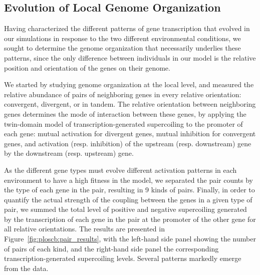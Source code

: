 \subsection{Evolution of Local Genome Organization}

Having characterized the different patterns of gene transcription that evolved in our simulations in response to the two different environmental conditions, we sought to determine the genome organization that necessarily underlies these patterns, since the only difference between individuals in our model is the relative position and orientation of the genes on their genome.

We started by studying genome organization at the local level, and measured the relative abundance of pairs of neighboring genes in every relative orientation: convergent, divergent, or in tandem.
The relative orientation between neighboring genes determines the mode of interaction between these genes, by applying the twin-domain model of transcription-generated supercoiling to the promoter of each gene: mutual activation for divergent genes, mutual inhibition for convergent genes, and activation (resp. inhibition) of the upstream (resp. downstream) gene by the downstream (resp. upstream) gene.

As the different gene types must evolve different activation patterns in each environment to have a high fitness in the model, we separated the pair counts by the type of each gene in the pair, resulting in 9 kinds of pairs.
Finally, in order to quantify the actual strength of the coupling between the genes in a given type of pair, we summed the total level of positive and negative supercoiling generated by the transcription of each gene in the pair at the promoter of the other gene for all relative orientations.
The results are presented in Figure~\ref{fig:ploscb:pair_results}, with the left-hand side panel showing the number of pairs of each kind, and the right-hand side panel the corresponding transcription-generated supercoiling levels.
Several patterns markedly emerge from the data.

